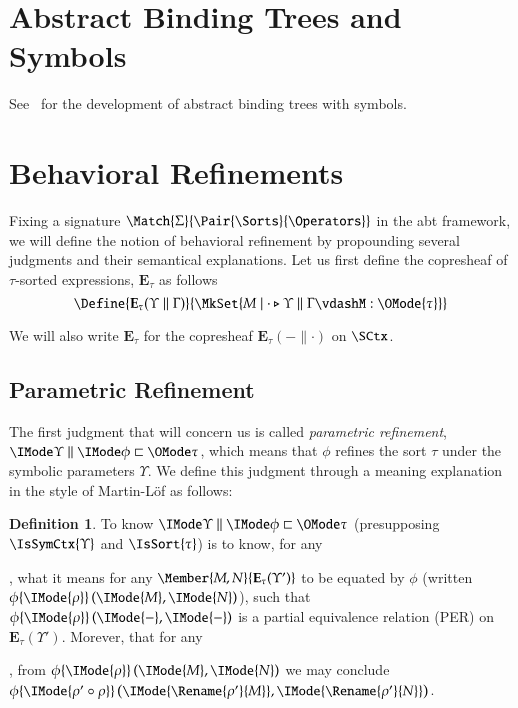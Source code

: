 \documentclass[11pt]{article}
\theoremstyle{definition}
\newtheorem{definition}[thm]{Definition}
\theoremstyle{notation}
\theoremstyle{remark}
\numberwithin{equation}{section}
\newcommand\IsAbtUnmoded[5]{
  #1\triangleright%
  #2\parallel%
  #3\vdash%
  #4:\OMode{#5}%
}
\newcommand\Exprs{\mathbf{E}}
\begin{document}
\section{Abstract Binding Trees and Symbols}

See~\cite{sterling-morrison:2015} for the development of abstract binding trees
with symbols. 

\section{Behavioral Refinements}

Fixing a signature $\Match{\Sigma}{\Pair{\Sorts}{\Operators}}$ in the abt
framework, we will define the notion of behavioral refinement by propounding
several judgments and their semantical explanations. Let us first define the
copresheaf of $\tau$-sorted expressions, $\Exprs_\tau$ as follows
\[
  \Define{
    \Exprs_\tau(\Upsilon\parallel\Gamma)
  }{
    \MkSet{M \mid \IsAbtUnmoded{\cdot}{\Upsilon}{\Gamma}{M}{\tau}}
  }
\]

We will also write $\Exprs_\tau$ for the copresheaf $\Exprs_\tau(-\parallel\cdot)$ on $\SCtx$.

\subsection{Parametric Refinement}
\label{sec:parametric-refinement}

The first judgment that will concern us is called \emph{parametric refinement},
$\Refines{\Upsilon}{\phi}{\tau}$, which means that $\phi$ refines the sort
$\tau$ under the symbolic parameters $\Upsilon$. We define this judgment
through a meaning explanation in the style of Martin-L\"of as follows:

\newcommand\RefEquate[4]{#1\{\IMode{#2}\}\left(\IMode{#3},\IMode{#4}\right)}

\begin{definition}
  To know $\Refines{\Upsilon}{\phi}{\tau}$ (presupposing $\IsSymCtx{\Upsilon}$
  and $\IsSort{\tau}$) is to know, for any
, what it means for any $\Member{M,N}{\Exprs_\tau(\Upsilon')}$ to be equated by
  $\phi$ (written $\RefEquate{\phi}{\rho}{M}{N}$), such that
  $\RefEquate{\phi}{\rho}{-}{-}$ is a partial equivalence relation (PER) on
  $\Exprs_\tau(\Upsilon')$. Morever, that for any
,
  from $\RefEquate{\phi}{\rho}{M}{N}$ we may conclude
  $\RefEquate{\phi}{\rho'\circ\rho}{\Rename{\rho'}{M}}{\Rename{\rho'}{N}}$.
\end{definition}
\end{document}
